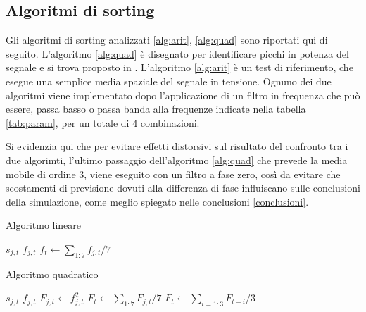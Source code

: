 \documentclass[9pt,twocolumn,twoside]{osajnl}
\begin{document}
\subsection{Algoritmi di sorting}

Gli algoritmi di sorting analizzati \ref{alg:arit}, \ref{alg:quad} sono riportati qui di seguito. L'algoritmo \ref{alg:quad} è disegnato per identificare picchi in potenza del segnale e si trova proposto in \cite{Lambacher2011}. L'algoritmo \ref{alg:arit} è un test di riferimento, che esegue una semplice media spaziale del segnale in tensione.
Ognuno dei due algoritmi viene implementato dopo l'applicazione di un filtro in frequenza che può essere, passa basso o passa banda alla frequenze indicate nella tabella \ref{tab:param}, per un totale di $4$ combinazioni.

Si evidenzia qui che per evitare effetti distorsivi sul risultato del confronto tra i due algorimti, l'ultimo passaggio dell'algoritmo \ref{alg:quad} che prevede la media mobile di ordine 3, viene eseguito con un filtro a fase zero, così da evitare che scostamenti di previsione dovuti alla differenza di fase influiscano sulle conclusioni della simulazione, come meglio spiegato nelle conclusioni \ref{conclusioni}.


\begin{algorithm}
\caption{Algoritmo lineare}\label{alg:arit}
\begin{algorithmic}[1]
\State $s_{j,t}$ 
\State $f_{j,t}$ 
\State $f_{t}\gets \sum_{1:7}   f_{j,t}/7$ 
\end{algorithmic}
\end{algorithm}


\begin{algorithm}
\caption{Algoritmo quadratico}\label{alg:quad}
\begin{algorithmic}[1]
\State $s_{j,t}$ 
\State $f_{j,t}$ 
\State $F_{j,t}\gets f^{2}_{j,t}$ 
\State $F_{t}\gets \sum_{1:7}   F_{j,t}/7$ 
\State $F_{t}\gets \sum_{i=1:3} F_{t-i}/3$ 
\end{algorithmic}
\end{algorithm}
\end{document}
